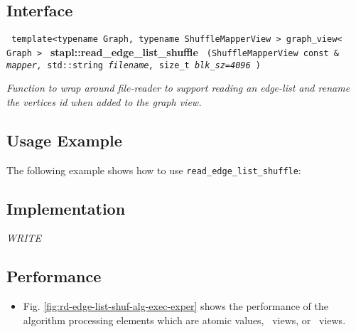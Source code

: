 \subsection{Interface} \label{sec-rd-edge-list-ren-alg-inter}

\noindent
\texttt{%
template<typename Graph, typename ShuffleMapperView >
\newline
graph\_view< Graph > 
}
\newline
\textbf{stapl::read\_edge\_list\_shuffle}%
\newline
\texttt{%
(ShuffleMapperView const \&
\textit{mapper,}%
std::string 
\textit{filename,}%
size\_t 
\textit{blk\_sz=4096}%
)
}
\vspace{0.4cm}

\textit{
Function to wrap around file-reader to support reading an edge-list and rename the vertices id when added to the graph view. 
}
\vspace{0.4cm}

\subsection{Usage Example} \label{sec-rd-edge-list-ren-alg-use}

The following example shows how to use 
\texttt{read\_edge\_list\_shuffle}:


\subsection{Implementation} \label{sec-rd-edge-list-ren-alg-impl}

\textit{WRITE}

\subsection{Performance} \label{sec-rd-edge-list-ren-alg-perf}

\begin{itemize}
\item
Fig. \ref{fig:rd-edge-list-shuf-alg-exec-exper}
shows the performance of the algorithm processing
elements which are atomic values, \stl\ views, or \stapl\ views.
\end{itemize}

